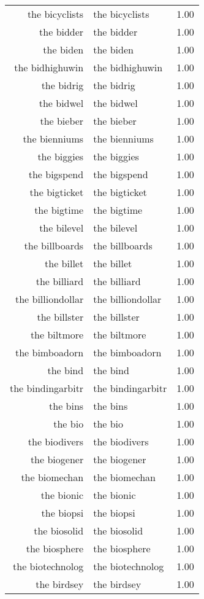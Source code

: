 \begin{table}[ht]
\begin{tabular}{rlr}
  the bicyclists & the bicyclists & 1.00 \\ 
  the bidder & the bidder & 1.00 \\ 
  the biden & the biden & 1.00 \\ 
  the bidhighuwin & the bidhighuwin & 1.00 \\ 
  the bidrig & the bidrig & 1.00 \\ 
  the bidwel & the bidwel & 1.00 \\ 
  the bieber & the bieber & 1.00 \\ 
  the bienniums & the bienniums & 1.00 \\ 
  the biggies & the biggies & 1.00 \\ 
  the bigspend & the bigspend & 1.00 \\ 
  the bigticket & the bigticket & 1.00 \\ 
  the bigtime & the bigtime & 1.00 \\ 
  the bilevel & the bilevel & 1.00 \\ 
  the billboards & the billboards & 1.00 \\ 
  the billet & the billet & 1.00 \\ 
  the billiard & the billiard & 1.00 \\ 
  the billiondollar & the billiondollar & 1.00 \\ 
  the billster & the billster & 1.00 \\ 
  the biltmore & the biltmore & 1.00 \\ 
  the bimboadorn & the bimboadorn & 1.00 \\ 
  the bind & the bind & 1.00 \\ 
  the bindingarbitr & the bindingarbitr & 1.00 \\ 
  the bins & the bins & 1.00 \\ 
  the bio & the bio & 1.00 \\ 
  the biodivers & the biodivers & 1.00 \\ 
  the biogener & the biogener & 1.00 \\ 
  the biomechan & the biomechan & 1.00 \\ 
  the bionic & the bionic & 1.00 \\ 
  the biopsi & the biopsi & 1.00 \\ 
  the biosolid & the biosolid & 1.00 \\ 
  the biosphere & the biosphere & 1.00 \\ 
  the biotechnolog & the biotechnolog & 1.00 \\ 
  the birdsey & the birdsey & 1.00 \\ 

\end{tabular}
\end{table}
